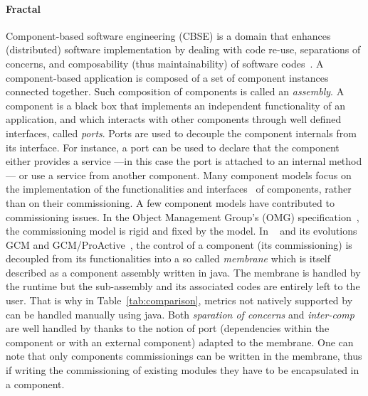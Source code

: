 \paragraph{Fractal}
Component-based software engineering (CBSE) is a domain that enhances
(distributed) software implementation by dealing with code re-use,
separations of concerns, and composability (thus maintainability) of
software codes~\cite{Szyperski:2002:CSB:515228}. A component-based
application is composed of a set of component instances connected
together. Such composition of components is called an
\emph{assembly}. A component is a black box that implements an
independent functionality of an application, and which interacts with
other components through well defined interfaces, called \emph{ports}.
Ports are used to decouple the component internals from its
interface. For instance, a port can be used to declare that the
component either provides a service ---in this case the port is
attached to an internal method--- or use a service from another
component. Many component models focus on the implementation of the
functionalities and
interfaces~\cite{corba:omg06,Blair2009,baude:hal-01001043,Bernholdt01052006,bigot:inria-00388508,Coullon2017}
of components, rather than on their commissioning. A few component
models have contributed to commissioning issues. In the Object
Management Group's (OMG) specification~\cite{ccmdeploy:omg06}, the
commissioning model is rigid and fixed by the model. In
\fractal~\cite{Blair2009} and its evolutions GCM and
GCM/ProActive~\cite{baude:hal-01001043}, the control of a component
(\eg its commissioning) is decoupled from its functionalities into a
so called \emph{membrane} which is itself described as a component
assembly written in java. The membrane is handled by the \fractal
runtime but the sub-assembly and its associated codes are entirely
left to the user. That is why in Table~\ref{tab:comparison}, metrics
not natively supported by \fractal can be handled manually using
java. Both \emph{sparation of concerns} and \emph{inter-comp} are well
handled by \fractal thanks to the notion of port (dependencies within
the component or with an external component) adapted to the
membrane. One can note that only \fractal components commissionings
can be written in the membrane, thus if writing the commissioning of
existing modules they have to be encapsulated in a \fractal component.

